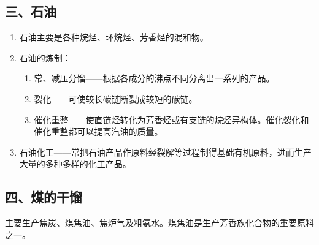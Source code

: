 \subsection*{三、石油}
\begin{enumerate}[1.]
  \item 石油主要是各种烷烃、环烷烃、芳香烃的混和物。
  \item 石油的炼制：
  \begin{enumerate}[(1)]
    \item 常、减压分馏——根据各成分的沸点不同分离出一系列的产品。
    \item 裂化——可使较长碳链断裂成较短的碳链。
    \item 催化重整——使直链烃转化为芳香烃或有支链的烷烃异构体。催化裂化和催化重整都可以提高汽油的质量。
  \end{enumerate}
  \item 石油化工——常把石油产品作原料经裂解等过程制得基础有机原料，进而生产大量的多种多样的化工产品。
\end{enumerate}

\subsection*{四、煤的干馏}
主要生产焦炭、煤焦油、焦炉气及粗氨水。煤焦油是生产芳香族化合物的重要原料之一。

